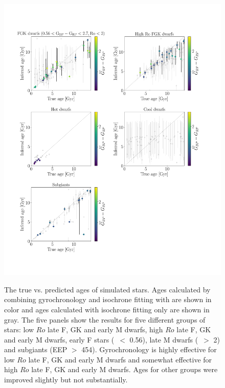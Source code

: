 \begin{figure}
  \caption{
The true vs. predicted ages of simulated stars.
    Ages calculated by combining gyrochronology
    and isochrone fitting with \sd are shown in color and ages calculated with
    isochrone fitting only are shown in gray.
The five panels show the results for five different groups of stars: low $Ro$
late F, GK and early M dwarfs, high $Ro$ late F, GK and early M dwarfs, early
    F stars (\gcolor\ $<$ 0.56), late M dwarfs (\gcolor\ $>$ 2) and subgiants
    (EEP $>$ 454).
Gyrochronology is highly effective for low $Ro$ late F, GK and early M dwarfs
and somewhat effective for high $Ro$ late F, GK and early M dwarfs.
Ages for other groups were improved slightly but not substantially.
}
  \centering
    \includegraphics[width=1\textwidth]{simulation_results}
\label{fig:simulation_results}
\end{figure}

